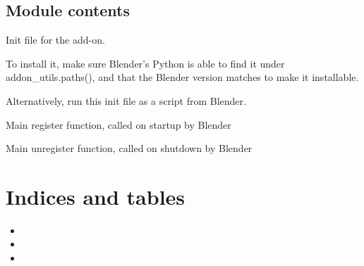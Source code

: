 \documentclass[letterpaper,10pt,english,openany,oneside]{sphinxmanual}
\begin{document}
\section{Module contents}
\label{\detokenize{io_anim_mvnx:module-io_anim_mvnx}}\label{\detokenize{io_anim_mvnx:module-contents}}
Init file for the add-on.

To install it, make sure Blender’s Python is able to find it under
addon\_utils.paths(), and that the Blender version matches to make it
installable.

Alternatively, run this init file as a script from Blender.

\begin{fulllineitems}
\label{\detokenize{io_anim_mvnx:io_anim_mvnx.register}}
Main register function, called on startup by Blender

\end{fulllineitems}


\begin{fulllineitems}
\label{\detokenize{io_anim_mvnx:io_anim_mvnx.unregister}}
Main unregister function, called on shutdown by Blender

\end{fulllineitems}



\chapter{Indices and tables}
\label{\detokenize{index:indices-and-tables}}\begin{itemize}
\item {} 

\item {} 

\item {} 

\end{itemize}
\end{document}
